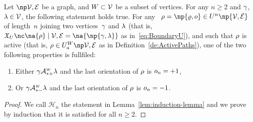 \documentclass[12pt]{article}
\begin{document}
{{\begin{lemma}
  Let \( \npOrientedGraph \) be a graph, 
  and $W\subset{\cal V}$ be a subset of vertices.
  For any $n\ge 2$ and $\gamma$, $\lambda \in {\cal V}$, the following statement
  holds true.
  For any
  \undirectedEdgePath\ \( \UndirectedPath = \np{\path,\orient} \in \UPATH^{n}\np{\graph} \) of length~$n$
  joining two vertices~$\gamma$ and $\lambda$ (that is,
  \( \BoundaryU{\na{\UndirectedPath}}{\graph}=\na{ \np{\bgent,\cgent} } \) as in~\eqref{eq:BoundaryU}), and
  such that \( \rho \) is active (that is,
  \( \UndirectedPath \in \ActiveUndirectedPaths{\graph} \) as in
  Definition~\ref{de:ActivePaths}), 
  one of the two following properties is fullfiled:
  \begin{enumerate}
  \item
    Either $\gamma\mathcal{A}^{\text{\tiny $W$}}_{*+} \lambda$ and
    the last orientation of $\rho$ is $o_n=+1$,
    \label{it:lem:induction-lemma_+1}
  \item
    Or $\gamma\mathcal{A}^{\text{\tiny $W$}}_{*-} \lambda$ and
    the last orientation of $\rho$ is $o_n=-1$.
    \label{it:lem:induction-lemma_-1}
  \end{enumerate}
  \label{lem:induction-lemma}
\end{lemma}


\begin{proof}
  We call ${\mathcal H}_{n}$ the statement in Lemma~\ref{lem:induction-lemma}
  and we prove by induction that it is satisfied for all $n\ge 2$.
  \medskip


\end{proof}}}
\end{document}
